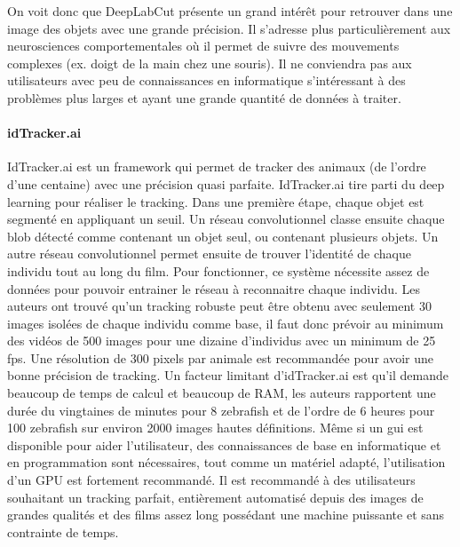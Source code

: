 \medbreak
  On voit donc que DeepLabCut présente un grand intérêt pour retrouver dans une image des objets avec une grande précision. Il s'adresse plus particulièrement aux neurosciences comportementales où il permet de suivre des mouvements complexes (ex. doigt de la main chez une souris). Il ne conviendra pas aux utilisateurs avec peu de connaissances en informatique s’intéressant à des problèmes plus larges et ayant une grande quantité de données à traiter.

  \paragraph{idTracker.ai}
  IdTracker.ai \cite{romero2019idtracker} est un framework qui permet de tracker des animaux (de l'ordre d'une centaine) avec une précision quasi parfaite. IdTracker.ai tire parti du deep learning pour réaliser le tracking. Dans une première étape, chaque objet est segmenté en appliquant un seuil. Un réseau convolutionnel classe ensuite chaque blob détecté comme contenant un objet seul, ou contenant plusieurs objets. Un autre réseau convolutionnel permet ensuite de trouver l'identité de chaque individu tout au long du film. Pour fonctionner, ce système nécessite assez de données pour pouvoir entrainer le réseau à reconnaitre chaque individu. Les auteurs ont trouvé qu'un tracking robuste peut être obtenu avec seulement 30 images isolées de chaque individu comme base, il faut donc prévoir au minimum des vidéos de 500 images pour une dizaine d'individus avec un minimum de 25 fps. Une résolution de 300 pixels par animale est recommandée pour avoir une bonne précision de tracking. Un facteur limitant d'idTracker.ai est qu'il demande beaucoup de temps de calcul et beaucoup de RAM, les auteurs rapportent une durée du vingtaines de minutes pour 8 zebrafish et de l'ordre de 6 heures pour 100 zebrafish sur environ 2000 images hautes définitions. Même si un gui est disponible pour aider l'utilisateur, des connaissances de base en informatique et en programmation sont nécessaires, tout comme un matériel adapté, l'utilisation d'un GPU est fortement recommandé. Il est recommandé à des utilisateurs souhaitant un tracking parfait, entièrement automatisé depuis des images de grandes qualités et des films assez long possédant une machine puissante et sans contrainte de temps.

